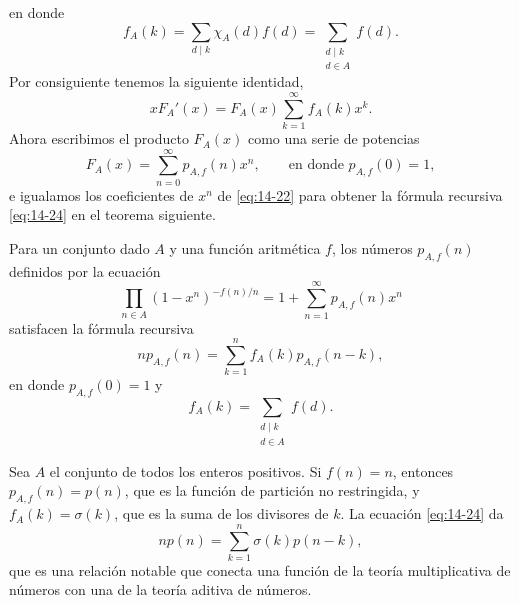 \documentclass[12pt,a4paper]{book}
\begin{document}
    en donde
    \begin{equation*}
        f_{A}(k)=\sum_{d\mid k}\chi_{A}(d)f(d)=\sum_{\substack{d\mid k\\d\in A}}f(d).
    \end{equation*}
    Por consiguiente tenemos la siguiente identidad,
    \begin{equation}\label{eq:14-22}
        xF_{A}'(x)=F_{A}(x)\sum_{k=1}^{\infty}f_{A}(k)x^{k}.
    \end{equation}
    Ahora escribimos el producto $F_{A}(x)$ como una serie de potencias
    \begin{equation*}
        F_{A}(x)=\sum_{n=0}^{\infty}p_{A,f}(n)x^{n},\qquad\text{en donde }p_{A,f}(0)=1,
    \end{equation*}
    e igualamos los coeficientes de $x^{n}$ de \eqref{eq:14-22} para obtener la fórmula recursiva
    \eqref{eq:14-24} en el teorema siguiente.

    \begin{teorema}\label{teo:14-8}
        Para un conjunto dado $A$ y una función aritmética $f$, los números $p_{A,f}(n)$
        definidos por la ecuación
        \begin{equation}\label{eq:14-23}
            \prod_{n\in A}(1-x^{n})^{-f(n)/n}=1+\sum_{n=1}^{\infty}p_{A,f}(n)x^{n}
        \end{equation}
        satisfacen la fórmula recursiva
        \begin{equation}\label{eq:14-24}
            np_{A,f}(n)=\sum_{k=1}^{n}f_{A}(k)p_{A,f}(n-k),
        \end{equation}
        en donde $p_{A,f}(0)=1$ y
        \begin{equation*}
            f_{A}(k)=\sum_{\substack{d\mid k\\d\in A}}f(d).
        \end{equation*}
    \end{teorema}

    \begin{ejemplo}
        Sea $A$ el conjunto de todos los enteros positivos. Si $f(n)=n$, entonces
        $p_{A,f}(n)=p(n)$, que es la función de partición no restringida, y
        $f_{A}(k)=\sigma(k)$, que es la suma de los divisores de $k$. La ecuación
        \eqref{eq:14-24} da
        \begin{equation*}
            np(n)=\sum_{k=1}^{n}\sigma(k)p(n-k),
        \end{equation*}
        que es una relación notable que conecta una función de la teoría multiplicativa de
        números con una de la teoría aditiva de números.
    \end{ejemplo}
\end{document}
